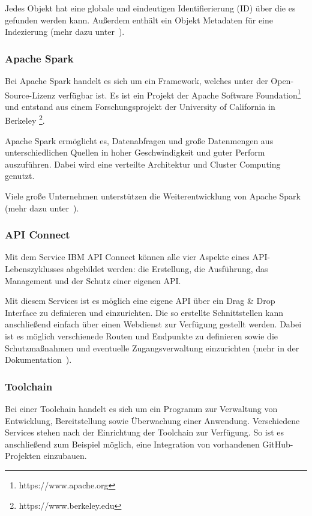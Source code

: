 Jedes Objekt hat eine globale und eindeutigen Identifierierung (ID) über die es gefunden werden kann. Außerdem enthält
ein Objekt Metadaten für eine Indezierung (mehr dazu unter~\cite{book_grundlagen_objectstorage}).

\subsubsection{Apache Spark}
Bei Apache Spark handelt es sich um ein Framework, welches unter der Open-Source-Lizenz verfügbar ist. Es ist ein Projekt
der Apache Software Foundation\footnote{https://www.apache.org} und entstand aus einem Forschungsprojekt der University
of California in Berkeley \footnote{https://www.berkeley.edu}.

Apache Spark ermöglicht es, Datenabfragen und große Datenmengen aus unterschiedlichen Quellen in hoher Geschwindigkeit
und guter Perform auszuführen. Dabei wird eine verteilte Architektur und Cluster Computing genutzt.

Viele große Unternehmen unterstützen die Weiterentwicklung von Apache Spark
(mehr dazu unter~\cite{book_grundlagen_apachespark}).

\subsubsection{API Connect}
Mit dem Service IBM API Connect können alle vier Aspekte eines API-Lebenszyklusses abgebildet werden: die Erstellung, die
Ausführung, das Management und der Schutz einer eigenen API.

Mit diesem Services ist es möglich eine eigene API über ein Drag \& Drop Interface zu definieren und einzurichten. Die
so erstellte Schnittstellen kann anschließend einfach über einen Webdienst zur Verfügung gestellt werden. Dabei ist es
möglich verschienede Routen und Endpunkte zu definieren sowie die Schutzmaßnahmen und eventuelle Zugangsverwaltung
einzurichten (mehr in der Dokumentation~\cite{book_grundlagen_apiconnect}).

\subsubsection{Toolchain}
Bei einer Toolchain handelt es sich um ein Programm zur Verwaltung von Entwicklung, Bereitstellung sowie Überwachung
einer Anwendung. Verschiedene Services stehen nach der Einrichtung der Toolchain zur Verfügung. So ist es anschließend
zum Beispiel möglich, eine Integration von vorhandenen GitHub-Projekten einzubauen.

